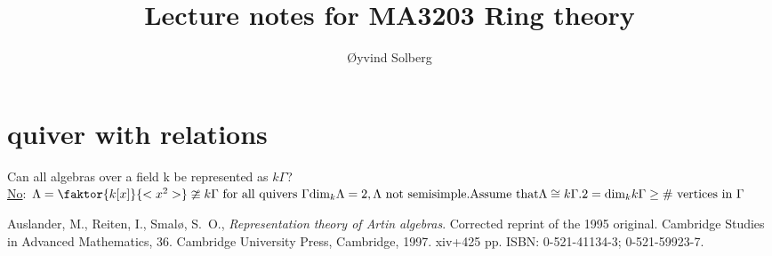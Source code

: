\documentclass{amsart}
\numberwithin{equation}{section}
\theoremstyle{definition}
\newcommand{\G}{\Gamma}
\begin{document}
\title{Lecture notes for MA3203 Ring theory}

\author{\O yvind Solberg}
\address{Department of Mathematical Sciences\\
NTNU\\
N-7491 Trondheim, Norway}

\maketitle
\tableofcontents




	
\section{quiver with relations}
Can all algebras over a field k be represented as $k\G$?\\\newline
\underline{No}: 
$\Lambda = \faktor{k[x]}{<x^2>} \ncong k\G \text{ for all quivers }\G
\text{dim}_{k}\Lambda = 2, \Lambda\text{ not semisimple}.\\\newline \text{Assume that}  \Lambda \cong k\G.\\
2= \text{dim}_kk\G \ge \text{\# vertices in } \G $






\printindex
\begin{thebibliography}{ARS}
 Auslander, M., Reiten, I., Smal\o, S.\ O.,
  \emph{Representation theory of Artin algebras}. Corrected reprint of
  the 1995 original. Cambridge Studies in Advanced Mathematics,
  36. Cambridge University Press, Cambridge, 1997. xiv+425 pp. ISBN:
  0-521-41134-3; 0-521-59923-7.
\end{thebibliography}
\end{document}
